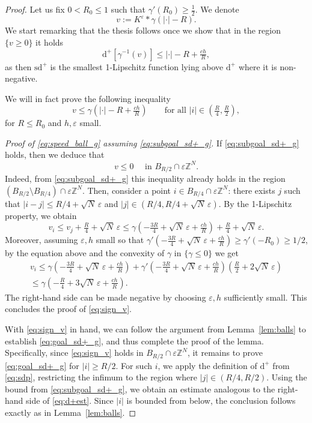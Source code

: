 \documentclass[10pt,a4paper]{amsart}
\newcommand{\Z}{\mathbb{Z}}
\newcommand{\e}{\varepsilon}
\newcommand{\ez}{\e\Z^N}
\newcommand{\g}{\gamma}
\begin{document}
\begin{proof}
Let us fix $0<R_0\le 1$ such that $\g'(R_0)\ge \frac12$. We denote 
\[
v:=K^\e\ast \g(|\cdot|-R).
\]
We start remarking that  the thesis 
follows once we show that in the region $\{ v\ge 0\}$ it holds 
\begin{equation}\label{eq:goal_sd+_g}
    \text{d}^+[\g^{-1}( v)]\le |\cdot|-R+\tfrac{ch}R,
\end{equation}
as then $\text{sd}^+$ is the smallest 1-Lipschitz function lying above $\text{d}^+$ where it is non-negative. 



We will in fact prove the following inequality
\begin{equation}\label{eq:subgoal_sd+_g}
    v\le \g(|\cdot|-R+\tfrac{ch}R)  \qquad \text{for all } |i|\in (\tfrac R4, \tfrac R2 ),
\end{equation}
for $R\le R_0$ and $h,\e$ small. 


 
\noindent\textit{Proof of \eqref{eq:speed_ball_g} assuming \eqref{eq:subgoal_sd+_g}.}
If \eqref{eq:subgoal_sd+_g} holds, then we deduce that  
\begin{equation}\label{eq:sign_v}
    v\le 0\quad  \text{ in } B_{R/2}\cap \ez.
\end{equation}
Indeed, from \eqref{eq:subgoal_sd+_g} this inequality already holds in the region $(B_{R/2}\setminus B_{R/4})\cap \ez$. Then, consider a point $i \in B_{R/4} \cap \ez$: there exists $j$ such that $|i - j| \le R/4 + \sqrt{N}\, \e$ and $  |j| \in (R/4,R/4 + \sqrt{N}\, \e)$. By the 1-Lipschitz property, we obtain
\[
v_i \le v_j + \tfrac{R}{4} + \sqrt{N}\, \e \le \g\left(-\tfrac{3R}{4} + \sqrt{N}\, \e + \tfrac{ch}{R}\right) + \tfrac{R}{4} + \sqrt{N}\, \e.
\]
Moreover, assuming $\e,h$  small so that $\g'(-\tfrac{3R}{4} + \sqrt{N}\, \e + \tfrac{ch}{R}) \ge \g'(-R_0) \ge 1/2$, by the equation above and the  convexity of $\g$ in $\{\g \le 0\}$ we get 
\[
\begin{split}
v_i \le \g\left(-\tfrac{3R}{4} + \sqrt{N}\, \e + \tfrac{ch}{R}\right) + \g'\left(-\tfrac{3R}{4} + \sqrt{N}\, \e + \tfrac{ch}{R}\right)\left(\tfrac{R}{2} + 2\sqrt{N}\, \e\right)\\
\le \g\left(-\tfrac{R}{4} + 3\sqrt{N}\, \e + \tfrac{ch}{R}\right).
\end{split}
\]
The right-hand side can be made negative by choosing $\e, h$ sufficiently small. This concludes the proof of \eqref{eq:sign_v}.

With \eqref{eq:sign_v} in hand, we can  follow the argument from Lemma~\ref{lem:balls} to establish \eqref{eq:goal_sd+_g}, and thus complete the proof of the lemma. Specifically, since \eqref{eq:sign_v} holds in $B_{R/2}\cap \ez$, it remains to prove \eqref{eq:goal_sd+_g} for $|i| \ge R/2$. For such $i$, we apply the definition of $\text{d}^+$ from \eqref{eq:sdp}, restricting the infimum to the region where $|j| \in (R/4, R/2)$. Using the bound from \eqref{eq:subgoal_sd+_g}, we obtain an estimate analogous to the right-hand side of \eqref{eq:d+est}. Since $|i|$ is bounded from below, the conclusion follows exactly as in Lemma~\ref{lem:balls}.




\end{proof}
\end{document}
